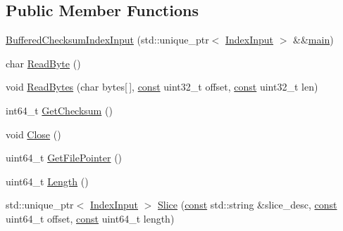 \subsection*{Public Member Functions}
\begin{DoxyCompactItemize}
\item 
\mbox{\hyperlink{classlucene_1_1core_1_1store_1_1BufferedChecksumIndexInput_afd7384af7f99e07f1a5df4a66ed3aa54}{Buffered\+Checksum\+Index\+Input}} (std\+::unique\+\_\+ptr$<$ \mbox{\hyperlink{classlucene_1_1core_1_1store_1_1IndexInput}{Index\+Input}} $>$ \&\&\mbox{\hyperlink{classlucene_1_1core_1_1store_1_1BufferedChecksumIndexInput_ab57fb18272b384d6cb10c59408103e0f}{main}})
\item 
char \mbox{\hyperlink{classlucene_1_1core_1_1store_1_1BufferedChecksumIndexInput_acbb041afa162556f78073457a4e790f3}{Read\+Byte}} ()
\item 
void \mbox{\hyperlink{classlucene_1_1core_1_1store_1_1BufferedChecksumIndexInput_a99c8cadcd9bdde48bd22144bc1829baf}{Read\+Bytes}} (char bytes\mbox{[}$\,$\mbox{]}, \mbox{\hyperlink{ZlibCrc32_8h_a2c212835823e3c54a8ab6d95c652660e}{const}} uint32\+\_\+t offset, \mbox{\hyperlink{ZlibCrc32_8h_a2c212835823e3c54a8ab6d95c652660e}{const}} uint32\+\_\+t len)
\item 
int64\+\_\+t \mbox{\hyperlink{classlucene_1_1core_1_1store_1_1BufferedChecksumIndexInput_a00eeaf29512d43fa7757be71e10ca4d5}{Get\+Checksum}} ()
\item 
void \mbox{\hyperlink{classlucene_1_1core_1_1store_1_1BufferedChecksumIndexInput_afdc432b747889c61d2452c532e18f2ed}{Close}} ()
\item 
uint64\+\_\+t \mbox{\hyperlink{classlucene_1_1core_1_1store_1_1BufferedChecksumIndexInput_abd1f04dcbc1c6ede194ce803f8b57032}{Get\+File\+Pointer}} ()
\item 
uint64\+\_\+t \mbox{\hyperlink{classlucene_1_1core_1_1store_1_1BufferedChecksumIndexInput_a9adedda82b5550162668a1a72149f207}{Length}} ()
\item 
std\+::unique\+\_\+ptr$<$ \mbox{\hyperlink{classlucene_1_1core_1_1store_1_1IndexInput}{Index\+Input}} $>$ \mbox{\hyperlink{classlucene_1_1core_1_1store_1_1BufferedChecksumIndexInput_a3dbbd2618e6ab6dfeee220ae5b6b8cda}{Slice}} (\mbox{\hyperlink{ZlibCrc32_8h_a2c212835823e3c54a8ab6d95c652660e}{const}} std\+::string \&slice\+\_\+desc, \mbox{\hyperlink{ZlibCrc32_8h_a2c212835823e3c54a8ab6d95c652660e}{const}} uint64\+\_\+t offset, \mbox{\hyperlink{ZlibCrc32_8h_a2c212835823e3c54a8ab6d95c652660e}{const}} uint64\+\_\+t length)
\end{DoxyCompactItemize}
